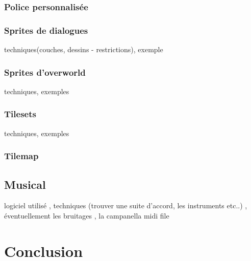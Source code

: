 \documentclass[11pt]{article}
\begin{document}
\subsubsection{Police personnalisée}
\subsubsection{Sprites de dialogues}
techniques(couches, dessins - restrictions), exemple 
\subsubsection{Sprites d'overworld}
techniques, exemples
\subsubsection{Tilesets}
techniques, exemples
\subsubsection{Tilemap}
\subsection{Musical}
logiciel utilisé , techniques (trouver une suite d'accord, les instruments etc..) , éventuellement les bruitages , la campanella midi file
\section{Conclusion}
\end{document}
